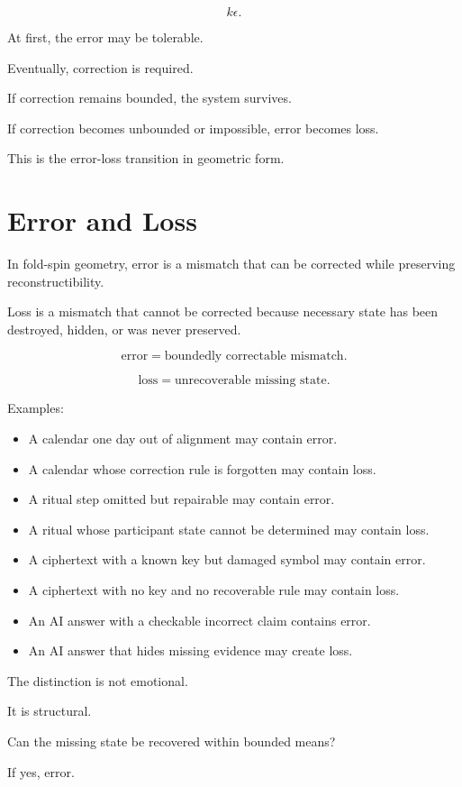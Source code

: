 \documentclass[11pt]{book}
\begin{document}
\[
k\epsilon.
\]

At first, the error may be tolerable.

Eventually, correction is required.

If correction remains bounded, the system survives.

If correction becomes unbounded or impossible, error becomes loss.

This is the error-loss transition in geometric form.

\section{Error and Loss}

In fold-spin geometry, error is a mismatch that can be corrected while preserving reconstructibility.

Loss is a mismatch that cannot be corrected because necessary state has been destroyed, hidden, or was never preserved.

\[
\text{error} = \text{boundedly correctable mismatch}.
\]

\[
\text{loss} = \text{unrecoverable missing state}.
\]

Examples:

\begin{itemize}
    \item A calendar one day out of alignment may contain error.
    \item A calendar whose correction rule is forgotten may contain loss.
    \item A ritual step omitted but repairable may contain error.
    \item A ritual whose participant state cannot be determined may contain loss.
    \item A ciphertext with a known key but damaged symbol may contain error.
    \item A ciphertext with no key and no recoverable rule may contain loss.
    \item An AI answer with a checkable incorrect claim contains error.
    \item An AI answer that hides missing evidence may create loss.
\end{itemize}

The distinction is not emotional.

It is structural.

Can the missing state be recovered within bounded means?

If yes, error.
\end{document}
